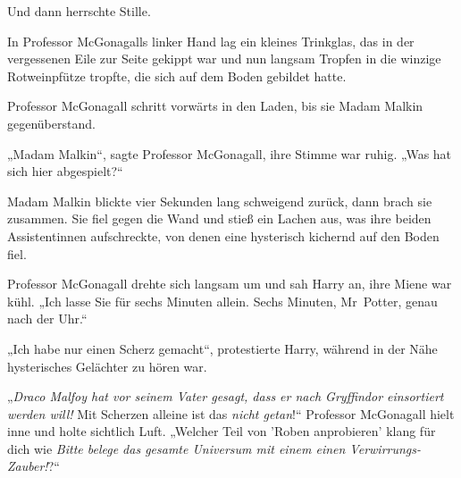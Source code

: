 Und dann herrschte Stille.

In Professor McGonagalls linker Hand lag ein kleines Trinkglas, das in der vergessenen Eile zur Seite gekippt war und nun langsam Tropfen in die winzige Rotweinpfütze tropfte, die sich auf dem Boden gebildet hatte.

Professor McGonagall schritt vorwärts in den Laden, bis sie Madam Malkin gegenüberstand.

„Madam Malkin“, sagte Professor McGonagall, ihre Stimme war ruhig. „Was hat sich hier abgespielt?“

Madam Malkin blickte vier Sekunden lang schweigend zurück, dann brach sie zusammen. Sie fiel gegen die Wand und stieß ein Lachen aus, was ihre beiden Assistentinnen aufschreckte, von denen eine hysterisch kichernd auf den Boden fiel.

Professor McGonagall drehte sich langsam um und sah Harry an, ihre Miene war kühl. „Ich lasse Sie für sechs Minuten allein. Sechs Minuten, Mr~Potter, genau nach der Uhr.“

„Ich habe nur einen Scherz gemacht“, protestierte Harry, während in der Nähe hysterisches Gelächter zu hören war.

„\emph{Draco Malfoy hat vor seinem Vater gesagt, dass er nach Gryffindor einsortiert werden will!} Mit Scherzen alleine ist das \emph{nicht getan}!“ Professor McGonagall hielt inne und holte sichtlich Luft. „Welcher Teil von 'Roben anprobieren' klang für dich wie \emph{Bitte belege das gesamte Universum mit einem einen Verwirrungs-Zauber!}?“

